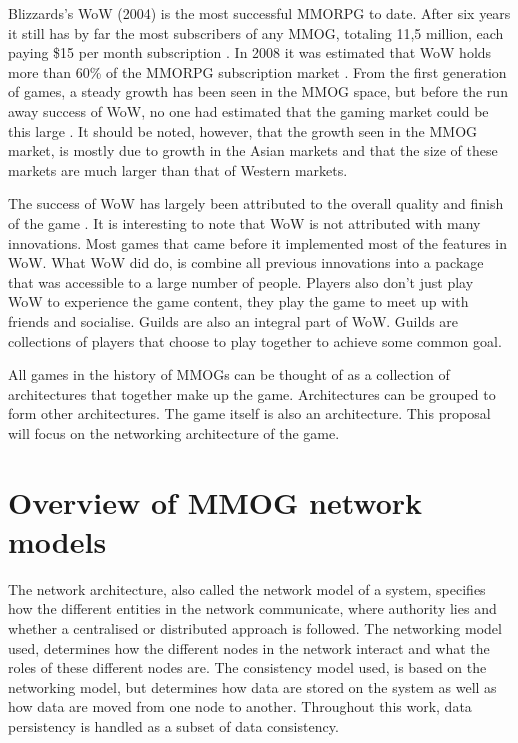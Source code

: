 \documentclass[journal,oneside,a4paper,onecolumn]{IEEEtran}
\begin{document}
Blizzards's \ac{WoW} (2004) is the most successful MMORPG to date. After six years it still has by far the most subscribers of any MMOG, totaling 11,5 million, each paying \$15 per month subscription \cite{wow_subscibers}. In 2008 it was estimated that WoW holds more than 60\% of the MMORPG subscription market \cite{mmog_sub_market}. From the first generation of games, a steady growth has been seen in the MMOG space, but before the run away success of WoW, no one had estimated that the gaming market could be this large \cite{mmog_growth_analysis}. It should be noted, however, that the growth seen in the \ac{MMOG} market, is mostly due to growth in the Asian markets and that the size of these markets are much larger than that of Western markets.

The success of \ac{WoW} has largely been attributed to the overall quality and finish of the game \cite{wow_gameplay}. It is interesting to note that WoW is not attributed with many innovations. Most games that came before it implemented most of the features in WoW. What WoW did do, is combine all previous innovations into a package that was accessible to a large number of people.  Players also don't just play WoW to experience the game content, they play the game to meet up with friends and socialise. Guilds are also an integral part of WoW. Guilds are collections of players that choose to play together to achieve some common goal.

All games in the history of \acp{MMOG} can be thought of as a collection of architectures that together make up the game. Architectures can be grouped to form other architectures. The game itself is also an architecture. This proposal will focus on the networking architecture of the game.


\section{Overview of MMOG network models}

The network architecture, also called the network model of a system, specifies how the different entities in the network communicate, where authority lies and whether a centralised or distributed approach is followed. The networking model used, determines how the different nodes in the network interact and what the roles of these different nodes are. The consistency model used, is based on the networking model, but determines how data are stored on the system as well as how data are moved from one node to another. Throughout this work, data persistency is handled as a subset of data consistency.
\end{document}
